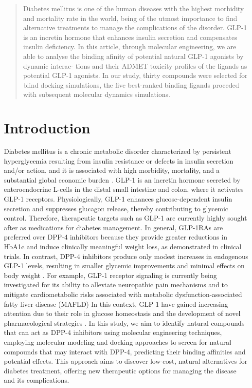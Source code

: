 \documentclass[portrait,final,20pt,ra0]{sciposter}
\begin{document}
\begin{multicols*}{3}
  \begin{abstract}
  Diabetes mellitus is one of the human diseases with the highest morbidity and mortality rate in the world, being of the utmost importance to find alternative treatments to manage the complications of the disorder. GLP-1 is an incretin hormone that enhances insulin secretion and compensates insulin deficiency. In this article, through molecular engineering, we are able to analyse the binding afinity of potential natural GLP-1 agonists by dynamic interac- tions and their ADMET toxicity profiles of the ligands as potential GLP-1 agonists. In our study, thirty compounds were selected for blind docking simulations, the five best-ranked binding ligands proceded with subsequent molecular dynamics simulations.

  \end{abstract}
  \section*{Introduction}
Diabetes mellitus is a chronic metabolic disorder characterized by persistent hyperglycemia resulting from insulin resistance or defects in insulin secretion and/or action, and it is associated with high morbidity, mortality, and a substantial global economic burden \cite{Zarei_2024,2025}. GLP-1 is an incretin hormone secreted by enteroendocrine L-cells in the distal small intestine and colon, where it activates GLP-1 receptors. Physiologically, GLP-1 enhances glucose-dependent insulin secretion and suppresses glucagon release, thereby contributing to glycemic control\cite{Brown2021,Kuthati2025}.
Therefore, therapeutic targets such as GLP-1 \cite{Fang2024} are currently highly sought after as medications for diabetes management. In general, GLP-1RAs are preferred over DPP-4 inhibitors because they provide greater reductions in HbA1c and induce clinically meaningful weight loss, as demonstrated in clinical trials. In contrast, DPP-4 inhibitors produce only modest increases in endogenous GLP-1 levels, resulting in smaller glycemic improvements and minimal effects on body weight \cite{Gilbert2020}.  For example, GLP-1 receptor signaling is currently being investigated for its ability to alleviate neuropathic pain mechanisms and to mitigate cardiometabolic risks associated with metabolic dysfunction-associated fatty liver disease (MAFLD) \cite{Kuthati2025, Pezzoli2025}
In this context, GLP-1 \cite{Gilbert2020} have gained increasing attention due to their role in glucose homeostasis and the development of novel pharmacological strategies \cite{Zarei_2024,Pezzoli2025}. In this study, we aim to identify natural compounds that can act as DPP-4 inhibitors using molecular engineering techniques, employing molecular modeling and docking approaches to screen for natural compounds that may interact with DPP-4, predicting their binding affinities and potential effects. This approach aims to discover low-cost, natural alternatives for diabetes treatment, offering new therapeutic options for managing the disease and its complications. 


\end{multicols*}
\end{document}
